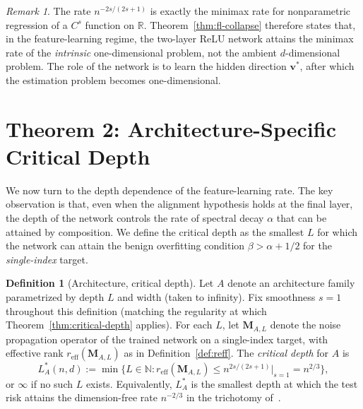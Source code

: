 \documentclass[12pt]{amsart}
\theoremstyle{definition}
\newtheorem{definition}[theorem]{Definition}
\theoremstyle{remark}
\newtheorem{remark}[theorem]{Remark}
\newcommand{\R}{\mathbb{R}}
\newcommand{\bM}{\mathbf{M}}
\newcommand{\bv}{\mathbf{v}}
\begin{document}
\begin{remark}\label{rem:smoothness-scaling}
The rate $n^{-2s/(2s+1)}$ is exactly the minimax rate for nonparametric
regression of a $C^{s}$ function on $\R$. Theorem~\ref{thm:fl-collapse}
therefore states that, in the feature-learning regime, the two-layer ReLU
network attains the minimax rate of the \emph{intrinsic} one-dimensional
problem, not the ambient $d$-dimensional problem. The role of the
network is to learn the hidden direction $\bv^{*}$, after which the
estimation problem becomes one-dimensional.
\end{remark}

\section{Theorem 2: Architecture-Specific Critical Depth}\label{sec:ld-statement}

We now turn to the depth dependence of the feature-learning rate. The key
observation is that, even when the alignment hypothesis holds at the final
layer, the depth of the network controls the rate of spectral decay
$\alpha$ that can be attained by composition. We define the critical
depth as the smallest $L$ for which the network can attain the benign
overfitting condition $\beta > \alpha + 1/2$ for the \emph{single-index}
target.

\begin{definition}[Architecture, critical depth]\label{def:critical-depth}
Let $A$ denote an architecture family parametrized by depth $L$ and width
(taken to infinity). Fix smoothness $s = 1$ throughout this definition
(matching the regularity at which Theorem~\ref{thm:critical-depth}
applies). For each $L$, let $\bM_{A,L}$ denote the noise
propagation operator of the trained network on a single-index target,
with effective rank $r_{\mathrm{eff}}(\bM_{A,L})$ as in
Definition~\ref{def:reff}. The \emph{critical depth} for $A$ is
\[
  L^{*}_{A}(n, d) := \min\bigl\{ L \in \mathbb{N} :
    r_{\mathrm{eff}}(\bM_{A,L}) \leq n^{2s/(2s+1)} \big|_{s=1}
    = n^{2/3}
  \bigr\},
\]
or $\infty$ if no such $L$ exists. Equivalently, $L^{*}_{A}$ is the
smallest depth at which the test risk attains the dimension-free rate
$n^{-2/3}$ in the trichotomy of~\cite{paperA}.
\end{definition}
\end{document}
